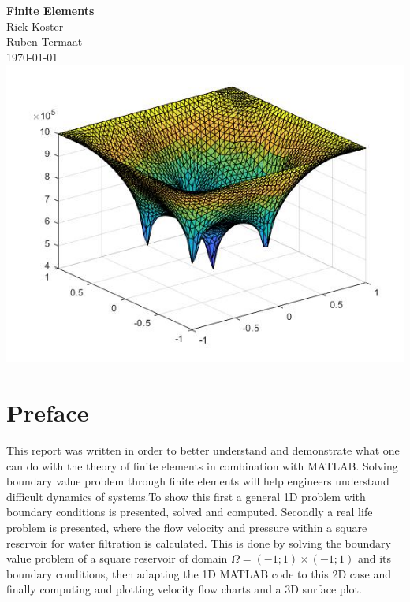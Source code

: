 \documentclass[a4paper]{report}
\begin{document}
	
\begin{titlepage}

		\centering
		\vspace*{5\baselineskip}
		\Huge
		\textbf{Finite Elements}
		\\[2\baselineskip]
		\normalsize
		Rick Koster\\
		Ruben Termaat\\
		\today
		\vfill
		\includegraphics[width=15cm]{3Dv.jpg}
		\vfill
	
\end{titlepage}
	
\clearpage\mbox{}\clearpage



\chapter*{Preface}
This report was written in order to better understand and demonstrate what one can do with the theory of finite elements in combination with MATLAB. Solving boundary value problem through finite elements will help engineers understand difficult dynamics of systems.To show this first a general 1D problem with boundary conditions is presented, solved and computed. Secondly a real life problem is presented, where the flow velocity and pressure within a square reservoir for water filtration is calculated. This is done by solving the boundary value problem of a square reservoir of domain  $\Omega= (-1; 1) \times (-1; 1)$ and its boundary conditions, then adapting the 1D MATLAB code to this 2D case and finally computing and plotting velocity flow charts and a 3D surface plot.
\end{document}
